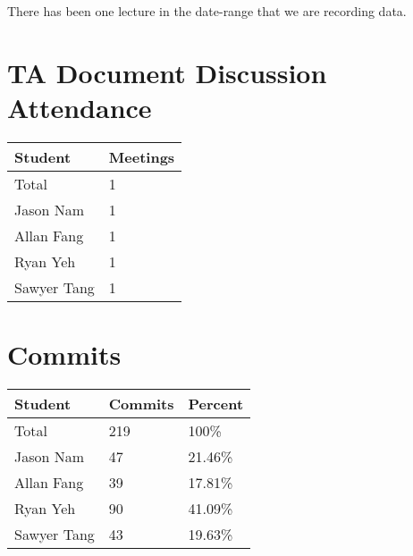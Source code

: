 \documentclass{article}
\begin{document}
There has been one lecture in the date-range that we are recording data.

\section{TA Document Discussion Attendance}


\begin{table}[H]
\centering
\begin{tabular}{ll}
\toprule
\textbf{Student} & \textbf{Meetings}\\
\midrule
Total & 1\\
Jason Nam & 1\\
Allan Fang & 1\\
Ryan Yeh & 1\\
Sawyer Tang & 1\\
\bottomrule
\end{tabular}
\end{table}


\section{Commits}


\begin{table}[H]
\centering
\begin{tabular}{lll}
\toprule
\textbf{Student} & \textbf{Commits} & \textbf{Percent}\\
\midrule
Total & 219 & 100\% \\
Jason Nam & 47 & 21.46\% \\
Allan Fang & 39 & 17.81\% \\
Ryan Yeh & 90 & 41.09\% \\
Sawyer Tang & 43 & 19.63\% \\
\bottomrule
\end{tabular}
\end{table}
\end{document}
